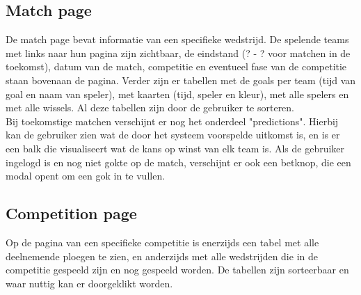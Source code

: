 \documentclass[11pt, a4paper]{article}
\begin{document}
\subsection{Match page}
De match page bevat informatie van een specifieke wedstrijd. De spelende teams met links naar hun pagina zijn zichtbaar, de eindstand (? - ? voor matchen in de toekomst), datum van de match, competitie en eventueel fase van de competitie staan bovenaan de pagina. Verder zijn er tabellen met de goals per team (tijd van goal en naam van speler), met kaarten (tijd, speler en kleur), met alle spelers en met alle wissels. Al deze tabellen zijn door de gebruiker te sorteren. \\ Bij toekomstige matchen verschijnt er nog het onderdeel "predictions". Hierbij kan de gebruiker zien wat de door het systeem voorspelde uitkomst is, en is er een balk die visualiseert wat de kans op winst van elk team is. Als de gebruiker ingelogd is en nog niet gokte op de match, verschijnt er ook een betknop, die een modal opent om een gok in te vullen.

\subsection{Competition page}
Op de pagina van een specifieke competitie is enerzijds een tabel met alle deelnemende ploegen te zien, en anderzijds met alle wedstrijden die in de competitie gespeeld zijn en nog gespeeld worden. De tabellen zijn sorteerbaar en waar nuttig kan er doorgeklikt worden.
\end{document}
